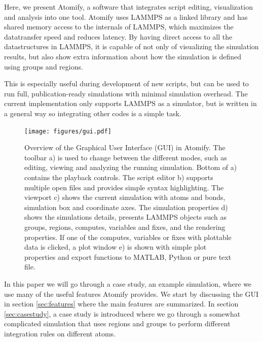 \documentclass[12pt,a4paper,final]{iopart}
\begin{document}
Here, we present Atomify, a software that integrates script editing,
visualization and analysis into one tool.
Atomify uses LAMMPS as a linked library and has shared memory access to the internals of LAMMPS,
which maximizes the datatransfer speed and reduces latency.
By having direct access to all the datastructures in LAMMPS, it is capable of not only of visualizing the simulation results,
but also show extra information about how the simulation is defined using groups and regions.

This is especially useful during development of new scripts, but can be used
to run full, publication-ready simulations with minimal simulation overhead.
The current implementation only supports LAMMPS as a simulator, but is written in a general
way so integrating other codes is a simple task.

\begin{figure}
	\centering
	\texttt{[image: figures/gui.pdf]}
	\caption{%
    Overview of the Graphical User Interface (GUI) in Atomify.
    The toolbar a) is used to change between the different modes, such as
    editing, viewing and analyzing the running simulation.
    Bottom of a) contains the playback controls.
    The script editor b) supports multiple open files and provides simple syntax highlighting.
    The viewport c) shows the current simulation with atoms and bonds, simulation box and coordinate axes.
    The simulation properties d) shows the simulations details, presents
    LAMMPS objects such as groups, regions, computes, variables and fixes, and the rendering
	properties. If one of the computes, variables or fixes with plottable data is clicked, a plot window
	e) is shown with simple plot properties and export functions to MATLAB, Python or pure text file.
    }
	\label{fig:gui}
\end{figure}

In this paper we will go through a case study, an example simulation, where we
use many of the useful features Atomify provides.
We start by discussing the GUI in section \ref{sec:features} where the main features are summarized.
In section \ref{sec:casestudy}, a case study is introduced where we go through a somewhat complicated simulation
that uses regions and groups to perform different integration rules on different atoms.
\end{document}
